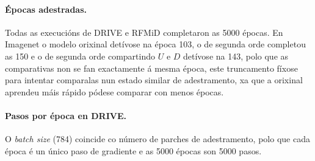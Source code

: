 \begin{table}[htb]
\centering
\small
{}
\caption[Hiperparámetros dos experimentos.]{Hiperparámetros dos experimentos para cada conxunto de datos. A execución de Imagenet de segunda orde retomouse dende un \emph{checkpoint} e o seu rexistro está unificado.}
\label{tab:hiperparametros}
\end{table}

\paragraph{Épocas adestradas.} Todas as execucións de DRIVE e RFMiD completaron as 5000 épocas. En Imagenet o modelo orixinal detívose na época 103, o de segunda orde completou as 150 e o de segunda orde compartindo $U$ e $D$ detívose na 143, polo que as comparativas non se fan exactamente á mesma época, este truncamento fíxose para intentar comparalas nun estado similar de adestramento, xa que a orixinal aprendeu máis rápido pódese comparar con menos épocas.

\paragraph{Pasos por época en DRIVE.} O \emph{batch size} (784) coincide co número de parches de adestramento, polo que cada época é un único paso de gradiente e as 5000 épocas son 5000 pasos.

